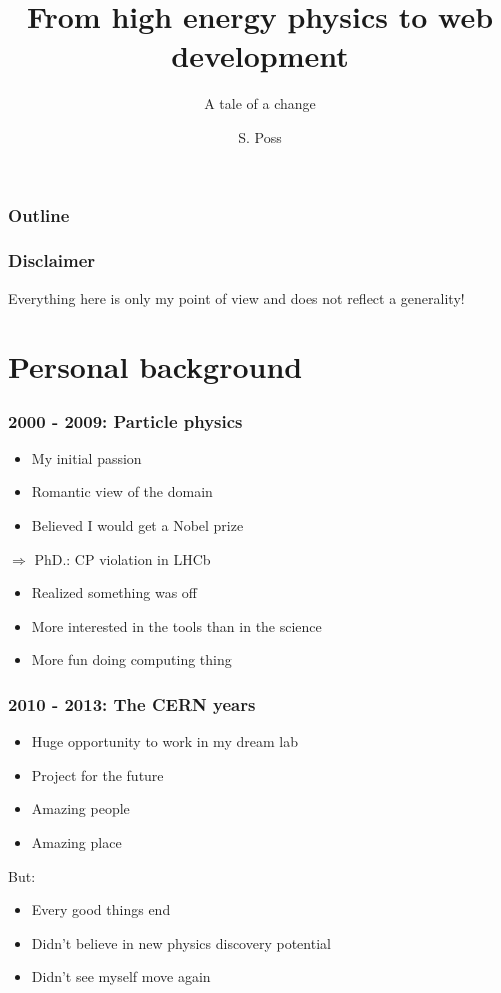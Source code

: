 \documentclass[]{beamer}
\author{S. Poss}
\title{From high energy physics to web development}
\subtitle{A tale of a change}
\begin{document}
\begin{frame}
\titlepage
\end{frame}

\begin{frame}
\frametitle{Outline}
\tableofcontents
\end{frame}

\begin{frame}
\frametitle{Disclaimer}
\centering
Everything here is only my point of view and does not reflect a generality!
\end{frame}

\section{Personal background}
\begin{frame}
\frametitle{2000 - 2009: Particle physics}
\begin{itemize}
\item My initial passion
\item Romantic view of the domain
\item Believed I would get a Nobel prize
\end{itemize}
$\Rightarrow$ PhD.: CP violation in LHCb
\pause
\begin{itemize}
\item Realized something was off
\item More interested in the tools than in the science
\item More fun doing computing thing
\end{itemize}
\end{frame}

\begin{frame}
\frametitle{2010 - 2013: The CERN years}
\begin{itemize}
\item Huge opportunity to work in my dream lab
\item Project for the future
\item Amazing people
\item Amazing place
\end{itemize}
\pause
But:
\begin{itemize}
\item Every good things end
\item Didn't believe in new physics discovery potential
\item Didn't see myself move again
\end{itemize}
\end{frame}
\end{document}
